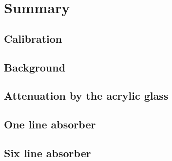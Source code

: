 \section{Summary}
\subsection{Calibration}

\subsection{Background}

\subsection{Attenuation by the acrylic glass}

\subsection{One line absorber}

\subsection{Six line absorber}